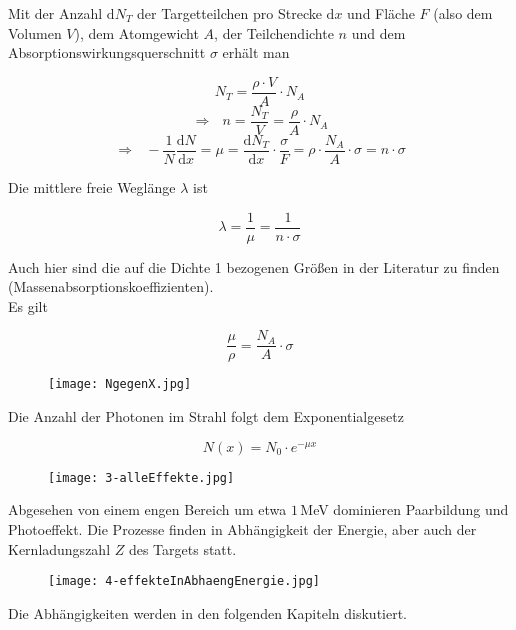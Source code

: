 Mit der Anzahl $\mathrm{d}N_T$ der Targetteilchen pro Strecke $\mathrm{d}x$ und Fläche $F$ (also
dem Volumen $V$), dem Atomgewicht $A$, der Teilchendichte $n$ und dem Absorptionswirkungsquerschnitt
$\sigma$ erhält man

\[N_T=\frac{\rho\cdot V}{A}\cdot N_A\]
\[\Rightarrow~~~n=\frac{N_T}{V}=\frac{\rho}{A}\cdot N_A\]
\[\Rightarrow~~~-\frac{1}{N}\frac{\mathrm{d}N}{\mathrm{d}x}=\mu=\frac{\mathrm{d}N_T}{\mathrm{d}x}\cdot
\frac{\sigma}{F}=\rho\cdot\frac{N_A}{A}\cdot\sigma=n\cdot\sigma \]

Die mittlere freie Weglänge $\lambda$ ist

\[ \lambda = \frac{1}{\mu}=\frac{1}{n\cdot \sigma} \]

Auch hier sind die auf die Dichte 1 bezogenen Größen in der Literatur zu finden
(Massenabsorptionskoeffizienten). 
\\
Es gilt

\[ \frac{\mu}{\rho}=\frac{N_A}{A}\cdot \sigma \]

\begin{figure}[H]
	\centering
	\texttt{[image: NgegenX.jpg]}
\end{figure}

Die Anzahl der Photonen im Strahl folgt dem Exponentialgesetz

\[N(x)=N_0\cdot e^{-\mu x} \]

\begin{figure}[H]
	\centering
	\texttt{[image: 3-alleEffekte.jpg]}
\end{figure}

Abgesehen von einem engen Bereich um etwa $1\,$MeV dominieren Paarbildung und Photoeffekt. Die
Prozesse finden in Abhängigkeit der Energie, aber auch der Kernladungszahl $Z$ des Targets statt. 

\begin{figure}[H]
	\centering
	\texttt{[image: 4-effekteInAbhaengEnergie.jpg]}
\end{figure}

Die Abhängigkeiten werden in den folgenden Kapiteln diskutiert. 
\FloatBarrier